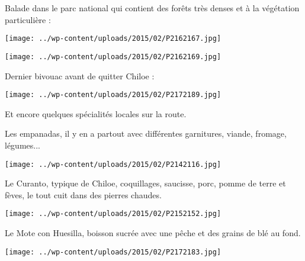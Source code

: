 \pagebreak
 Balade dans le parc national qui contient des forêts très denses et à la végétation particulière :
\begin{center} \texttt{[image: ../wp-content/uploads/2015/02/P2162167.jpg]} \end{center}
\begin{center} \texttt{[image: ../wp-content/uploads/2015/02/P2162169.jpg]} \end{center}
\vspace{-\topsep}
\vspace{-3mm}

\pagebreak
  Dernier bivouac avant de quitter Chiloe :
\begin{center} \texttt{[image: ../wp-content/uploads/2015/02/P2172189.jpg]} \end{center}

 Et encore quelques spécialités locales sur la route.

 Les empanadas, il y en a partout avec différentes garnitures, viande, fromage, légumes...
\begin{center} \texttt{[image: ../wp-content/uploads/2015/02/P2142116.jpg]} \end{center}
\vspace{-\topsep}

\pagebreak
 Le Curanto, typique de Chiloe, coquillages, saucisse, porc, pomme de terre et fèves, le tout cuit dans des pierres chaudes.
 \vfill
 \begin{center} \texttt{[image: ../wp-content/uploads/2015/02/P2152152.jpg]} \end{center}

\vfill
 Le Mote con Huesilla, boisson sucrée avec une pêche et des grains de blé au fond.
 \vfill
\begin{center} \texttt{[image: ../wp-content/uploads/2015/02/P2172183.jpg]} \end{center}
\vspace{-\topsep}
\vspace{-0.75mm}